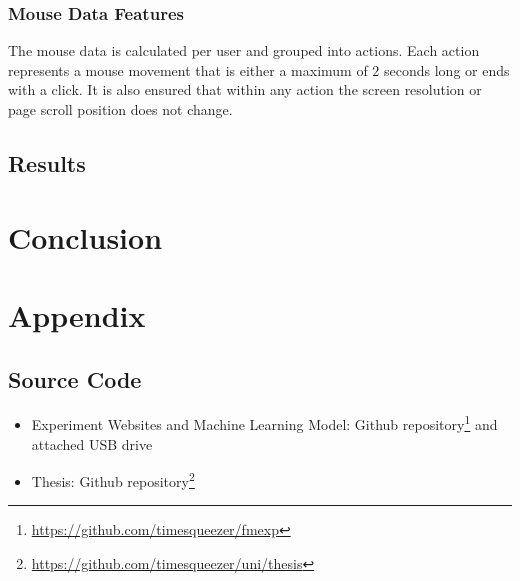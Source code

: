 \documentclass[
    fontsize=12pt,
    headings=small,
    parskip=half,           %
    bibliography=totoc,
    numbers=noenddot,       %
    open=any,               %
    final                   %
    ]{scrreprt}
\begin{document}
\subsection{Mouse Data Features}

The mouse data is calculated per user and grouped into actions. Each action represents a mouse movement that is either a maximum of $2$ seconds long or ends with a click. It is also ensured that within any action the screen resolution or page scroll position does not change.

\section{Results}

\chapter{Conclusion}

\chapter{Appendix}

\section{Source Code}

\begin{itemize}
	\item Experiment Websites and Machine Learning Model: Github repository\footnote{\url{https://github.com/timesqueezer/fmexp}} and attached USB drive
	\item Thesis: Github repository\footnote{\url{https://github.com/timesqueezer/uni/thesis}}
\end{itemize}



\begin{raggedright}
  \printbibliography
\end{raggedright}
\end{document}
